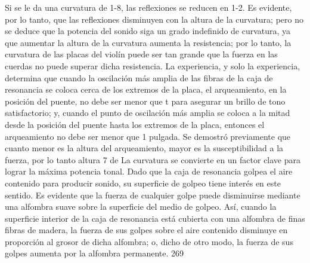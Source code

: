 Si se le da una curvatura de 1-8, las reflexiones se reducen en 1-2. Es evidente, por lo tanto, que las reflexiones disminuyen con la altura de la curvatura; pero no se deduce que la potencia del sonido siga un grado indefinido de curvatura, ya que aumentar la altura de la curvatura aumenta la resistencia; por lo tanto, la curvatura de las placas del violín puede ser tan grande que la fuerza en las cuerdas no puede superar dicha resistencia.
La experiencia, y solo la experiencia, determina que cuando la oscilación más amplia de las fibras de la caja de resonancia se coloca cerca de los extremos de la placa, el arqueamiento, en la posición del puente, no debe ser menor que t para asegurar un brillo de tono satisfactorio; y, cuando el punto de oscilación más amplia se coloca a la mitad desde la posición del puente hasta los extremos de la placa, entonces el arqueamiento no debe ser menor que 1 pulgada. Se demostró previamente que cuanto menor es la altura del arqueamiento, mayor es
la susceptibilidad a la fuerza, por lo tanto altura 7
de
La curvatura se convierte en un factor clave para lograr la máxima potencia tonal.
Dado que la caja de resonancia golpea el aire contenido para producir sonido, su superficie de golpeo tiene interés en este sentido. Es evidente que la fuerza de cualquier golpe puede disminuirse mediante una alfombra suave sobre la superficie del medio de golpeo. Así, cuando la superficie interior de la caja de resonancia está cubierta con una alfombra de finas fibras de madera, la fuerza de sus golpes sobre el aire contenido disminuye en proporción al grosor de dicha alfombra; o, dicho de otro modo, la fuerza de sus golpes aumenta por la alfombra permanente.
269

